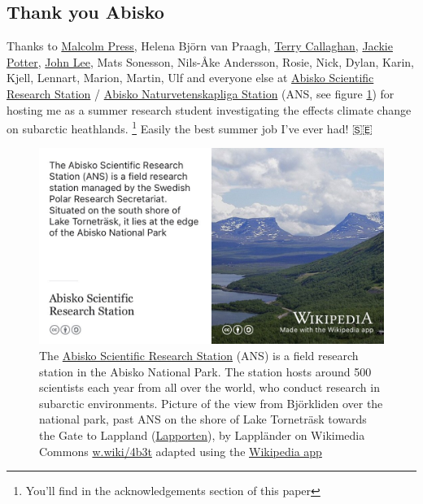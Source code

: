 \documentclass[
]{book}
\begin{document}
\hypertarget{abisko}{%
\subsection{Thank you Abisko}\label{abisko}}

Thanks to \href{https://en.wikipedia.org/wiki/Malcolm_Press}{Malcolm Press}, Helena Björn van Praagh, \href{https://en.wikipedia.org/wiki/Terry_Callaghan}{Terry Callaghan}, \href{https://www.brookes.ac.uk/ocsld/about-ocsld/staff-profiles/jackie-potter/}{Jackie Potter}, \href{https://www.sheffield.ac.uk/biosciences/people/academic-staff/john-lee}{John Lee}, Mats Sonesson, Nils-Åke Andersson, Rosie, Nick, Dylan, Karin, Kjell, Lennart, Marion, Martin, Ulf and everyone else at \href{https://en.wikipedia.org/wiki/Abisko_Scientific_Research_Station}{Abisko Scientific Research Station} / \href{https://sv.wikipedia.org/wiki/Abisko_naturvetenskapliga_station}{Abisko Naturvetenskapliga Station} (ANS, see figure \ref{fig:abisko-fig}) for hosting me as a summer research student investigating the effects climate change on subarctic heathlands. \citep{subarctic}\footnote{You'll find in the acknowledgements section of this paper} Easily the best summer job I've ever had! 🇸🇪

\begin{figure}

{\centering \includegraphics[width=0.99\linewidth]{images/abisko} 

}

\caption{The \href{https://en.wikipedia.org/wiki/Abisko_Scientific_Research_Station}{Abisko Scientific Research Station} (ANS) is a field research station in the Abisko National Park. The station hosts around 500 scientists each year from all over the world, who conduct research in subarctic environments. Picture of the view from Björkliden over the national park, past ANS on the shore of Lake Torneträsk towards the Gate to Lappland (\href{https://en.wikipedia.org/wiki/Lapporten}{Lapporten}), by Lappländer on Wikimedia Commons \href{https://w.wiki/4b3t}{w.wiki/4b3t} adapted using the \href{https://apps.apple.com/us/app/wikipedia/id324715238}{Wikipedia app}}\label{fig:abisko-fig}
\end{figure}
\end{document}
